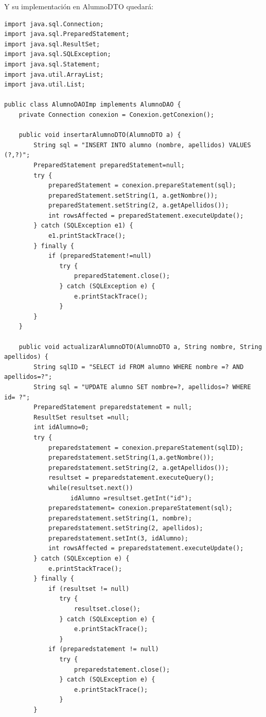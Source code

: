 \documentclass[4paper]{article}
\begin{document}
Y su implementación en AlumnoDTO quedará:
\begin{lstlisting}
import java.sql.Connection;
import java.sql.PreparedStatement;
import java.sql.ResultSet;
import java.sql.SQLException;
import java.sql.Statement;
import java.util.ArrayList;
import java.util.List;

public class AlumnoDAOImp implements AlumnoDAO {
    private Connection conexion = Conexion.getConexion();
	
    public void insertarAlumnoDTO(AlumnoDTO a) {
        String sql = "INSERT INTO alumno (nombre, apellidos) VALUES (?,?)";
        PreparedStatement preparedStatement=null;
        try {
            preparedStatement = conexion.prepareStatement(sql);
            preparedStatement.setString(1, a.getNombre());
            preparedStatement.setString(2, a.getApellidos());
            int rowsAffected = preparedStatement.executeUpdate();
        } catch (SQLException e1) {
            e1.printStackTrace();
        } finally {
            if (preparedStatement!=null)
               try {
                   preparedStatement.close();
               } catch (SQLException e) {
                   e.printStackTrace();
               }
        }
    }

    public void actualizarAlumnoDTO(AlumnoDTO a, String nombre, String apellidos) {
        String sqlID = "SELECT id FROM alumno WHERE nombre =? AND apellidos=?";
        String sql = "UPDATE alumno SET nombre=?, apellidos=? WHERE id= ?";
        PreparedStatement preparedstatement = null;
        ResultSet resultset =null;
        int idAlumno=0;
        try {
            preparedstatement = conexion.prepareStatement(sqlID);
            preparedstatement.setString(1,a.getNombre());
            preparedstatement.setString(2, a.getApellidos());
            resultset = preparedstatement.executeQuery();
            while(resultset.next())
                  idAlumno =resultset.getInt("id");
            preparedstatement= conexion.prepareStatement(sql);
            preparedstatement.setString(1, nombre);
            preparedstatement.setString(2, apellidos);
            preparedstatement.setInt(3, idAlumno);
            int rowsAffected = preparedstatement.executeUpdate();
        } catch (SQLException e) {
            e.printStackTrace();
        } finally {
            if (resultset != null)
               try {
                   resultset.close();
               } catch (SQLException e) {
                   e.printStackTrace();
               }
            if (preparedstatement != null)
               try {
                   preparedstatement.close();
               } catch (SQLException e) {
                   e.printStackTrace();
               }
        }
		

\end{lstlisting}
\end{document}
